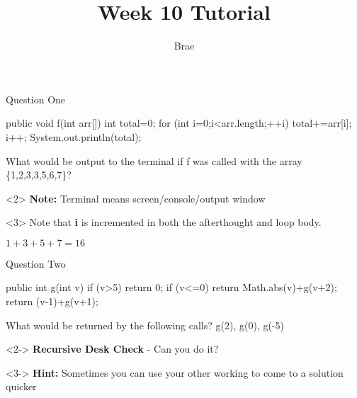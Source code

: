 \documentclass[12]{beamer}
\title{Week 10 Tutorial}
\author{Brae}
\institute {CSSE2002: Programming in the Large}
\begin{document}

\begin{frame}
\titlepage
\end{frame}

\begin{frame}[t, fragile]{Question One} \vspace{4pt}

\begin{java}
public void f(int arr[]) {
    int total=0;
    for (int i=0;i<arr.length;++i) {
        total+=arr[i];
        i++;
    }
    System.out.println(total);
}
\end{java}
What would be output to the terminal if f was called with the array \{1,2,3,3,5,6,7\}?

\begin{onlyenv}<2>
\textbf{Note:} Terminal means screen/console/output window
\end{onlyenv}

\begin{onlyenv}<3>
Note that \textbf{i} is incremented in both the afterthought and loop body.

$1 + 3 + 5 + 7 = 16$
\end{onlyenv}

\end{frame}

\begin{frame}[t, fragile]{Question Two} \vspace{4pt}

\begin{java}
public int g(int v) {
    if (v>5) {
        return 0;
    }
    if (v<=0) {
        return Math.abs(v)+g(v+2);
    }
    return (v-1)+g(v+1);
}
\end{java}

What would be returned by the following calls? g(2), g(0), g(-5)

\begin{onlyenv}<2->
\textbf{Recursive Desk Check} - Can you do it?
\end{onlyenv}

\begin{onlyenv}<3->
\textbf{Hint:} Sometimes you can use your other working to come to a solution quicker
\end{onlyenv}

\end{frame}
\end{document}

